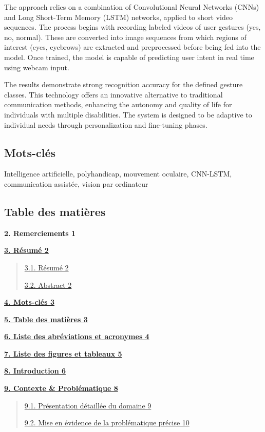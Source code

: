 \documentclass[
]{article}
\begin{document}
The approach relies on a combination of Convolutional Neural Networks (CNNs) and Long Short-Term Memory (LSTM) networks, applied to short video sequences. The process begins with recording labeled videos of user gestures (yes, no, normal). These are converted into image sequences from which regions of interest (eyes, eyebrows) are extracted and preprocessed before being fed into the model. Once trained, the model is capable of predicting user intent in real time using webcam input.

The results demonstrate strong recognition accuracy for the defined gesture classes. This technology offers an innovative alternative to traditional communication methods, enhancing the autonomy and quality of life for individuals with multiple disabilities. The system is designed to be adaptive to individual needs through personalization and fine-tuning phases.

\hypertarget{mots-cluxe9s}{%
\subsection{Mots-clés}\label{mots-cluxe9s}}

Intelligence artificielle, polyhandicap, mouvement oculaire, CNN-LSTM, communication assistée, vision par ordinateur

\hypertarget{table-des-matiuxe8res}{%
\subsection{Table des matières}\label{table-des-matiuxe8res}}

\textbf{2. Remerciements 1}

\href{/l}{\textbf{3. Résumé 2}}

\begin{quote}
\href{/l}{3.1. Résumé 2}

\href{/l}{3.2. Abstract 2}
\end{quote}

\href{/l}{\textbf{4. Mots-clés 3}}

\href{/l}{\textbf{5. Table des matières 3}}

\href{/l}{\textbf{6. Liste des abréviations et acronymes 4}}

\href{/l}{\textbf{7. Liste des figures et tableaux 5}}

\href{/l}{\textbf{8. Introduction 6}}

\href{/l}{\textbf{9. Contexte \& Problématique 8}}

\begin{quote}
\href{/l}{9.1. Présentation détaillée du domaine 9}

\href{/l}{9.2. Mise en évidence de la problématique précise 10}
\end{quote}
\end{document}
